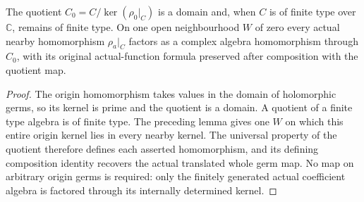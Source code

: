 \begin{theorem}
\label{hir:relative-normal-coefficient-algebra-domain-nearby-homs}
\leanok
{}
The quotient $C_0=C/\ker(\rho_0|_C)$ is a domain and, when $C$ is of
finite type over $\mathbb C$, remains of finite type. On one open neighbourhood
$W$ of zero every actual nearby homomorphism $\rho_a|_C$ factors as a complex
algebra homomorphism through $C_0$, with its original actual-function formula
preserved after composition with the quotient map.
\end{theorem}
\begin{proof}
The origin homomorphism takes values in the domain of holomorphic germs, so its
kernel is prime and the quotient is a domain. A quotient of a finite type
algebra is of finite type. The preceding lemma gives one $W$ on which this
entire origin kernel lies in every nearby kernel. The universal property of
the quotient therefore defines each asserted homomorphism, and its defining
composition identity recovers the actual translated whole germ map. No map
on arbitrary origin germs is required: only the finitely generated actual
coefficient algebra is factored through its internally determined kernel.
\end{proof}

